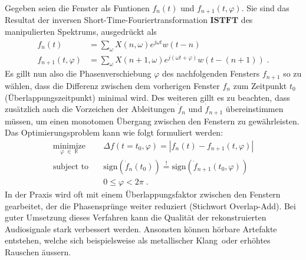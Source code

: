 Gegeben seien die Fenster als Funtionen $f_n(t)$ und $f_{n+1}(t, \varphi)$.
Sie sind das Resultat der inversen Short-Time-Fouriertransformation $\textbf{ISTFT}$ des manipulierten Spektrums,
ausgedrückt als
\begin{equation}
    \begin{aligned}
        f_n(t)
        &=
        \sum_{\omega} X(n, \omega) e^{j\omega t} w(t - n) \\
        f_{n+1}(t, \varphi)
        &=
        \sum_{\omega} X(n+1, \omega) e^{j(\omega t + \varphi)} w(t - (n+1)) \;.
    \end{aligned}
\end{equation}
Es gillt nun also die Phasenverschiebung $\varphi$ des nachfolgenden Fensters $f_{n+1}$ so zu wählen,
dass die Differenz zwischen dem vorherigen Fenster $f_n$ zum Zeitpunkt $t_0$ (Überlappungszeitpunkt) minimal wird.
Des weiteren gillt es zu beachten, dass zusätzlich auch die Vorzeichen der Ableitungen $\dot{f}_n$ und $\dot{f}_{n+1}$ übereinstimmen müssen,
um einen monotomen Übergang zwischen den Fenstern zu gewährleisten.
Das Optimierungsproblem kann wie folgt formuliert werden:
\begin{equation}
    \begin{aligned}
        \underset{\varphi \; \in \; \mathbb{R}}{\text{minimize}}
        & \quad
        \Delta f(t=t_0, \varphi) = |f_n(t) - f_{n + 1}(t, \varphi)| \\
        \text{subject to}
        & \quad
        \text{sign}(\dot{f}_n(t_0)) \stackrel{!}{=} \text{sign}(\dot{f}_{n + 1}(t_0, \varphi)) \\
        & \quad
        0 \leq \varphi < 2\pi \;.
    \end{aligned}
\end{equation}
In der Praxis wird oft mit einem Überlappungsfaktor zwischen den Fenstern gearbeitet, der die Phasensprünge weiter reduziert (Stichwort Overlap-Add).
Bei guter Umsetzung dieses Verfahren kann die Qualität der rekonstruierten Audiosignale stark verbessert werden.
Ansonsten können hörbare Artefakte entstehen, welche sich beispielsweise als \glqq metallischer Klang\grqq\ oder erhöhtes Rauschen äussern.

